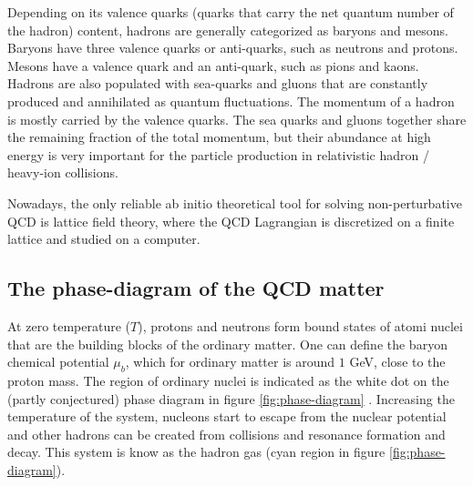 Depending on its valence quarks (quarks that carry the net quantum number of the hadron) content, hadrons are generally categorized as baryons and mesons.
Baryons have three valence quarks or anti-quarks, such as neutrons and protons.
Mesons have a valence quark and an anti-quark, such as pions and kaons.
Hadrons are also populated with sea-quarks and gluons that are constantly produced and annihilated as quantum fluctuations.
The momentum of a hadron is mostly carried by the valence quarks.
The sea quarks and gluons together share the remaining fraction of the total momentum, but their abundance at high energy is very important for the particle production in relativistic hadron / heavy-ion collisions.

Nowadays, the only reliable ab initio theoretical tool for solving non-perturbative QCD is lattice field theory, where the QCD Lagrangian is discretized on a finite lattice and studied on a computer.

\subsection{The phase-diagram of the QCD matter}
At zero temperature ($T$), protons and neutrons form bound states of atomi nuclei that are the building blocks of the ordinary matter.
One can define the baryon chemical potential $\mu_b$, which for ordinary matter is around $1$ GeV, close to the proton mass.
The region of ordinary nuclei is indicated as the white dot on the (partly conjectured) phase diagram in figure \ref{fig:phase-diagram} \cite{Geesaman:2015fha}.
Increasing the temperature of the system, nucleons start to escape from the nuclear potential and other hadrons can be created from collisions and resonance formation and decay.
This system is know as the hadron gas (cyan region in figure \ref{fig:phase-diagram}).


